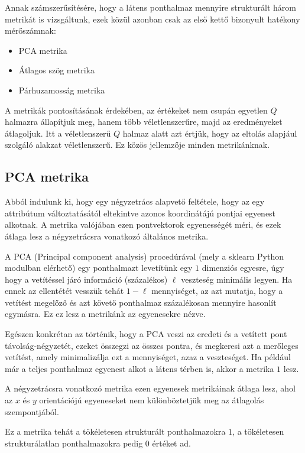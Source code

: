 Annak számszerűsítésére, hogy a látens ponthalmaz mennyire strukturált három metrikát is vizsgáltunk, ezek közül azonban csak az első kettő bizonyult hatékony mérőszámnak:
\begin{itemize}
  \item PCA metrika
  \item Átlagos szög metrika
  \item Párhuzamosság metrika
\end{itemize}

A metrikák pontosításának érdekében, az értékeket nem csupán egyetlen $Q$ halmazra állapítjuk meg, hanem több véletlenszerűre,   majd az eredményeket átlagoljuk. Itt a véletlenszerű $Q$ halmaz alatt azt értjük, hogy az eltolás alapjául szolgáló alakzat véletlenszerű. Ez közös jellemzője minden metrikánknak.

\subsection{PCA metrika}

Abból indulunk ki, hogy egy négyzetrács alapvető feltétele, hogy az egy attribútum változtatásától eltekintve azonos koordinátájú pontjai egyenest alkotnak.  A metrika valójában ezen pontvektorok egyenességét méri, és ezek átlaga lesz a négyzetrácsra vonatkozó általános metrika.

A PCA (Principal component analysis) procedúrával (mely a sklearn Python modulban elérhető) egy ponthalmazt levetítünk egy $1$ dimenziós egyesre, úgy hogy a vetítéssel járó információ (százalékos) $\ell$ veszteség minimális legyen. Ha ennek az ellentétét vesszük tehát $1-\ell$ mennyiséget, az azt mutatja, hogy a vetítést megelőző és azt követő ponthalmaz százalékosan mennyire hasonlít egymásra. Ez ez lesz a metrikánk az egyenesekre nézve. 

Egészen konkrétan az történik, hogy a PCA veszi az eredeti és a vetített pont távolság-négyzetét, ezeket összegzi az összes pontra, és megkeresi azt a merőleges vetítést, amely minimalizálja ezt a mennyiséget, azaz a veszteséget.
Ha például már a teljes ponthalmaz egyenest alkot a látens térben is, akkor a metrika $1$ lesz.

A négyzetrácsra vonatkozó metrika ezen egyenesek metrikáinak átlaga lesz, ahol az $x$ és $y$ orientációjú egyeneseket nem különböztetjük meg az átlagolás szempontjából.

Ez a metrika tehát a tökéletesen strukturált ponthalmazokra $1$, a tökéletesen strukturálatlan ponthalmazokra pedig $0$ értéket ad.

